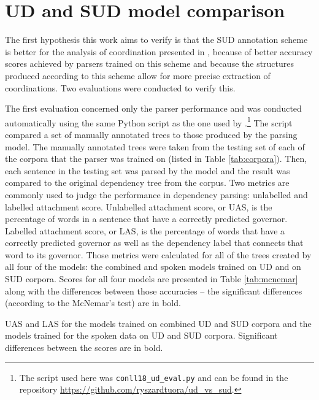 \section{UD and SUD model comparison}
The first hypothesis this work aims to verify is that the SUD annotation scheme is better for the analysis of coordination presented in \cite{prz:etal:24}, because of better accuracy scores achieved by parsers trained on this scheme \citep{tuo:prz:lac:21} and because the structures produced according to this scheme allow for more precise extraction of coordinations. Two evaluations were conducted to verify this.

The first evaluation concerned only the parser performance and was conducted automatically using the same Python script as the one used by \cite{tuo:prz:lac:21}.\footnote{The script used here was \texttt{conll18\_ud\_eval.py} and can be found in the repository \url{https://github.com/ryszardtuora/ud_vs_sud}.} The script compared a set of manually annotated trees to those produced by the parsing model. The manually annotated trees were taken from the testing set of each of the corpora that the parser was trained on (listed in Table \ref{tab:corpora}). Then, each sentence in the testing set was parsed by the model and the result was compared to the original dependency tree from the corpus. Two metrics are commonly used to judge the performance in dependency parsing: unlabelled and labelled attachment score. Unlabelled attachment score, or UAS, is the percentage of words in a sentence that have a correctly predicted governor. Labelled attachment score, or LAS, is the percentage of words that have a correctly predicted governor as well as the dependency label that connects that word to its governor. Those metrics were calculated for all of the trees created by all four of the models: the combined and spoken models trained on UD and on SUD corpora. Scores for all four models are presented in Table \ref{tab:mcnemar} along with the differences between those accuracies -- the significant differences (according to the McNemar's test) are in bold.

\begin{table}[h!]
\centering
{}
\caption{\centering UAS and LAS for the models trained on combined UD and SUD corpora and the models trained for the spoken data on UD and SUD corpora. Significant differences between the scores are in bold.}\label{tab:mcnemar}
\end{table}

